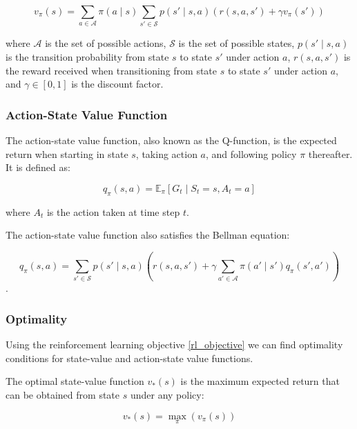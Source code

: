 \begin{equation}
v_{\pi}(s) = \sum_{a \in \mathcal{A}} \pi(a \mid s) \sum_{s' \in \mathcal{S}} p(s' \mid s,a) \left(r(s,a,s') + \gamma v_{\pi}(s')\right)
\end{equation}

where $\mathcal{A}$ is the set of possible actions, $\mathcal{S}$ is the set of possible states, $p(s' \mid s,a)$ is the transition probability 
from state $s$ to state $s'$ under action $a$, $r(s,a,s')$ is the reward received when transitioning from state $s$ to state $s'$ under 
action $a$, and $\gamma \in [0,1]$ is the discount factor.

\subsubsection{Action-State Value Function}

The action-state value function, also known as the Q-function, is the expected return when starting in state $s$, taking action $a$, and following 
policy $\pi$ thereafter. It is defined as:

\begin{equation}
q_{\pi}(s,a) = \mathbb{E}_{\pi}\left[G_t \mid S_t = s, A_t = a\right]
\end{equation}

where $A_t$ is the action taken at time step $t$.

The action-state value function also satisfies the Bellman equation:

\begin{equation}
q_{\pi}(s,a) = \sum_{s' \in \mathcal{S}} p(s' \mid s,a) \left(r(s,a,s') + \gamma \sum_{a' \in \mathcal{A}} \pi(a' \mid s') q_{\pi}(s',a')\right)
\end{equation}
.

\subsubsection{Optimality}

Using the reinforcement learning objective \ref{rl_objective} we can find optimality conditions for state-value and action-state value functions.

The optimal state-value function $v_*(s)$ is the maximum expected return that can be obtained from state $s$ under any policy:

\begin{equation}
v_*(s) = \max_{\pi} (v_{\pi}(s))
\end{equation}


